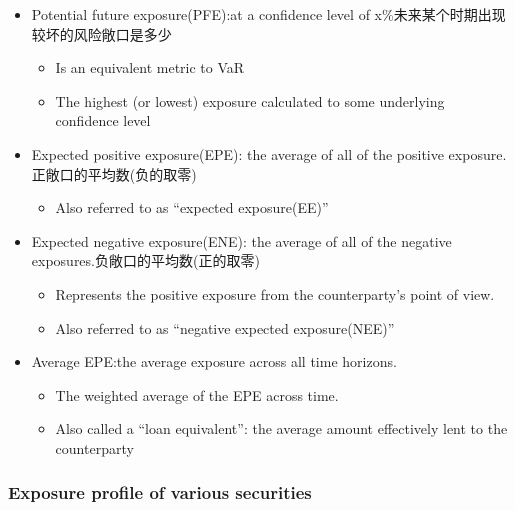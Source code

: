\begin{itemize}
\item Potential future exposure(PFE):at a confidence level of x\%未来某个时期出现较坏的风险敞口是多少
\begin{itemize}
    \item Is an equivalent metric to VaR
    \item The highest (or lowest) exposure calculated to some underlying confidence level
\end{itemize}

\item Expected positive exposure(EPE): the average of all of the positive exposure.正敞口的平均数(负的取零)
\begin{itemize}
    \item Also referred to as “expected exposure(EE)”
\end{itemize}
\item Expected negative exposure(ENE): the average of all of the negative exposures.负敞口的平均数(正的取零)
\begin{itemize}
    \item Represents the positive exposure from the counterparty's point of view.
    \item Also referred to as “negative expected exposure(NEE)”
\end{itemize}
\item Average EPE:the average exposure across all time horizons.
\begin{itemize}
    \item The weighted average of the EPE across time.
    \item Also called a “loan equivalent”: the average amount effectively lent to the counterparty
\end{itemize}

\end{itemize}






\subsubsection{Exposure profile of various securities}

